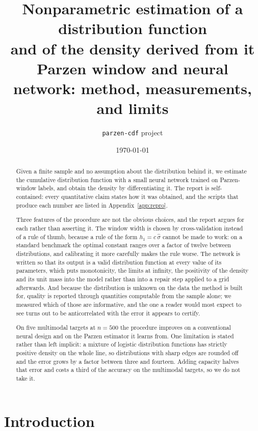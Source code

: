 \documentclass[11pt]{article}
\title{Nonparametric estimation of a distribution function\\
and of the density derived from it\\
\large Parzen window and neural network: method, measurements, and limits}
\author{\texttt{parzen-cdf} project}
\date{\today}
\newcommand{\shat}{\hat{\sigma}}
\begin{document}
\maketitle

\begin{abstract}
\noindent Given a finite sample and no assumption about the distribution behind it, we
estimate the cumulative distribution function with a small neural network trained on
Parzen-window labels, and obtain the density by differentiating it. The report is
self-contained: every quantitative claim states how it was obtained, and the scripts that
produce each number are listed in Appendix~\ref{app:repro}.

Three features of the procedure are not the obvious choices, and the report argues for each
rather than asserting it. The window width is chosen by cross-validation instead of a rule of
thumb, because a rule of the form $h_1 = c\,\shat$ cannot be made to work: on a standard
benchmark the optimal constant ranges over a factor of twelve between distributions, and
calibrating it more carefully makes the rule worse. The network is written so that its output
is a valid distribution function at every value of its parameters, which puts monotonicity,
the limits at infinity, the positivity of the density and its unit mass into the model rather
than into a repair step applied to a grid afterwards. And because the distribution is unknown
on the data the method is built for, quality is reported through quantities computable from
the sample alone; we measured which of those are informative, and the one a reader would most
expect to see turns out to be anticorrelated with the error it appears to certify.

On five multimodal targets at $n = 500$ the procedure improves on a conventional neural design
and on the Parzen estimator it learns from. One limitation is stated rather than left implicit:
a mixture of logistic distribution functions has strictly positive density on the whole line,
so distributions with sharp edges are rounded off and the error grows by a factor between
three and fourteen. Adding capacity halves that error and costs a third of the accuracy on the
multimodal targets, so we do not take it.
\end{abstract}

\tableofcontents
\newpage

\section{Introduction}
\end{document}
